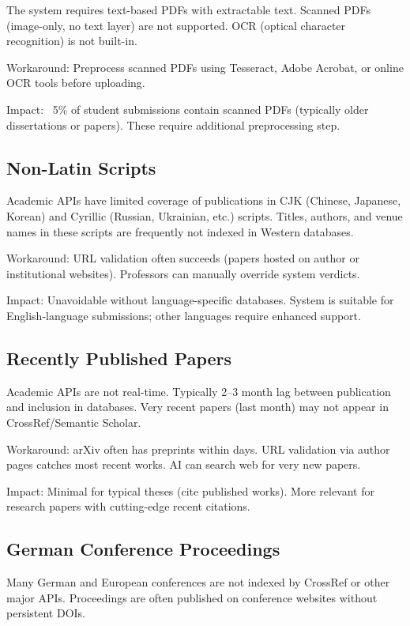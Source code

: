 \documentclass[12pt,a4paper,oneside]{report}
\begin{document}
The system requires text-based PDFs with extractable text. Scanned PDFs (image-only, no text layer) are not supported. OCR (optical character recognition) is not built-in.

Workaround: Preprocess scanned PDFs using Tesseract, Adobe Acrobat, or online OCR tools before uploading.

Impact: ~5\% of student submissions contain scanned PDFs (typically older dissertations or papers). These require additional preprocessing step.

\subsection{Non-Latin Scripts}

Academic APIs have limited coverage of publications in CJK (Chinese, Japanese, Korean) and Cyrillic (Russian, Ukrainian, etc.) scripts. Titles, authors, and venue names in these scripts are frequently not indexed in Western databases.

Workaround: URL validation often succeeds (papers hosted on author or institutional websites). Professors can manually override system verdicts.

Impact: Unavoidable without language-specific databases. System is suitable for English-language submissions; other languages require enhanced support.

\subsection{Recently Published Papers}

Academic APIs are not real-time. Typically 2--3 month lag between publication and inclusion in databases. Very recent papers (last month) may not appear in CrossRef/Semantic Scholar.

Workaround: arXiv often has preprints within days. URL validation via author pages catches most recent works. AI can search web for very new papers.

Impact: Minimal for typical theses (cite published works). More relevant for research papers with cutting-edge recent citations.

\subsection{German Conference Proceedings}

Many German and European conferences are not indexed by CrossRef or other major APIs. Proceedings are often published on conference websites without persistent DOIs.
\end{document}
